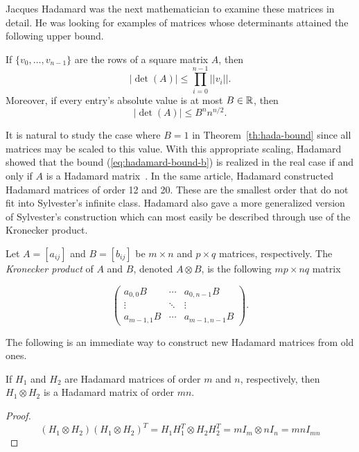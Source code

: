 Jacques Hadamard was the next mathematician to examine these matrices in detail. He was looking for examples of matrices whose determinants attained the following upper bound.

\begin{theorem} \label{th:hada-bound}
 If $\{v_{0},\dots,v_{n-1}\}$ are the rows of a square matrix $A$, then \begin{equation}\label{eq:hadamard-bound-a}|\det(A)| \leq \displaystyle\prod_{i=0}^{n-1}||v_i||.\end{equation} Moreover, if every entry's absolute value is at most $B \in \mathbb{R}$, then \begin{equation}\label{eq:hadamard-bound-b}|\det(A)| \leq B^nn^{n/2}.\end{equation}
\end{theorem}

It is natural to study the case where $B=1$ in Theorem~\ref{th:hada-bound} since all matrices may be scaled to this value. With this appropriate scaling, Hadamard showed that the bound (\ref{eq:hadamard-bound-b}) is realized in the real case if and only if $A$ is a Hadamard matrix~\cite{hadamard}. In the same article, Hadamard constructed Hadamard matrices of order 12 and 20. These are the smallest order that do not fit into Sylvester's infinite class. Hadamard also gave a more generalized version of Sylvester's construction which can most easily be described through use of the Kronecker product.

\begin{definition} \label{def:kronecker-product}
 Let $A = [a_{ij}]$ and $B = [b_{ij}]$ be $m \times n$ and $p \times q$ matrices, respectively. The {\it Kronecker product} of $A$ and $B$, denoted $A \otimes B$, is the following $mp \times nq$ matrix

 $$\left(\begin{array}{ccccc}
          a_{0,0}B & \cdots  & a_{0,n-1}B \\
           \vdots & \ddots & \vdots \\
          a_{m-1,1}B & \cdots  & a_{m-1,n-1}B
         \end{array}\right).$$
\end{definition}

The following is an immediate way to construct new Hadamard matrices from old ones.

\begin{lemma} \label{lem:kronecker}
 If $H_1$ and $H_2$ are Hadamard matrices of order $m$ and $n$, respectively, then $H_1 \otimes H_2$ is a Hadamard matrix of order $mn$.
 \begin{proof}
  $$(H_1 \otimes H_2)(H_1 \otimes H_2)^T = H_1H_1^T \otimes H_2H_2^T = mI_m \otimes nI_n = mnI_{mn}$$
 \end{proof}
\end{lemma}

